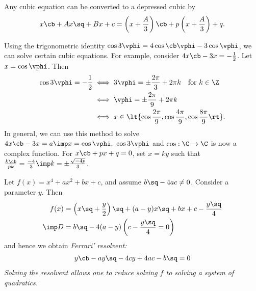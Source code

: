 \documentclass{article}
\begin{document}

 \quad
Any cubic equation can be converted to a depressed cubic by \begin{align*}
  x\cb+Ax\sq+Bx+c = \left(x+\frac{A}{3}\right)\cb + p\left(x+\frac{A}{3}\right) + q.
\end{align*}

\begin{ttheorem}
Using the trigonometric identity \( \cos 3\vphi = 4\cos\cb \vphi-3\cos\vphi \), we can solve certain cubic equations.
For example, consider \( 4x\cb-3x=-\frac{1}{2} \).
Let \( x=\cos \vphi \).
Then \begin{align*}
  \cos 3\vphi = -\frac{1}{2} &\iff 3\vphi = \pm \frac{2\pi}{3}+2\pi k \quad \text{for } k\in \Z \\
  &\iff \vphi = \pm\frac{2\pi}{9}+2\pi k \\
  &\iff x \in \lt\{ \cos\frac{2\pi}{9},\cos\frac{4\pi}{9},\cos\frac{8\pi}{9} \rt\}.
\end{align*}
In general, we can use this method to solve \( 4x\cb-3x=a \imp x=\cos\vphi,\ \cos 3\vphi \) and \( \cos:\C\to\C \) is now a complex function.
For \( x\cb+px+q = 0 \), set \( x=ky \) such that \( \frac{k\cb}{pk} = \frac{-4}{3} \imp k = \pm\frac{\sqrt{-4p}}{3} \).
\end{ttheorem}

\begin{tdefinition}
  Let \( f(x) = x^4 + a x^2 + b x + c \), and assume \( b\sq-4ac\neq 0 \).
  Consider a parameter \( y \).
  Then \begin{align*}
    f(x) &= \left( x\sq + \frac{y}{2} \right)\sq + (a-y)x\sq + bx + c - \frac{y\sq}{4} \\
     \imp D &= b\sq - 4(a-y)\left( c-\frac{y\sq}{4} = 0 \right)
  \end{align*}
  and hence we obtain \it{Ferrari' resolvent}:
  \begin{align*}
    y\cb-ay\sq -4cy + 4ac - b\sq = 0
  \end{align*}
  Solving the resolvent allows one to reduce solving \( f \) to solving a system of quadratics.
\end{tdefinition}
\end{document}
